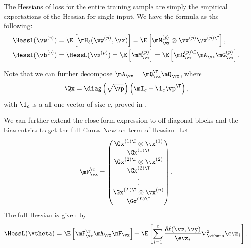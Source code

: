 The Hessians of loss for the entire training sample are simply the empirical expectations of the Hessian for single input. We have the formula as the following:
\begin{align}
    \HessL(\vw^{(p)}) &= \E\left[\mH_\ell(\vw^{(p)}, \vx)\right] = \E\left[\mM^{(p)}_\vx \otimes \vx^{(p)}\vx^{(p)\T}\right],\label{eqn:app_layerwise_approx}\\
    \HessL(\vb^{(p)}) &= \HessL(\vz^{(p)}) = \E\left[\mM^{(p)}_\vx\right] = \E\left[\mG_\vx^{(p)\T}\mA_\vx\mG_\vx^{(p)}\right].
\end{align}

Note that we can further decompose $\mA_\vx = \mQ_\vx^\T\mQ_\vx$, where 
\begin{equation}
    \Qx = \diag\left(\sqrt{\vp}\right)\left(\mI_c-\1_c\vp^\T\right),
    \label{eqn:app_qx}
\end{equation}
with $\1_c$ is a all one vector of size $c$, proved in \citet{papyan2019measurements}.

We can further extend the close form expression to off diagonal blocks and the bias entries to get the full Gauss-Newton term of Hessian. Let
\begin{align}
    \mF^\T_\vx = \begin{pmatrix}
    \Gx^{(1)\T} \otimes \vx^{(1)}\\
    \Gx^{(1)\T}\\
    \Gx^{(2)\T} \otimes \vx^{(2)}\\
    \Gx^{(2)\T}\\
    \vdots\\
    \Gx^{(L)\T} \otimes \vx^{(n)}\\
    \Gx^{(L)\T}
    \end{pmatrix}.
\end{align}
The full Hessian is given by
\begin{equation}
    \HessL(\vtheta) = \E \left[\mF^\T_{\vx}\mA_\vx\mF_{\vx}\right] + \E\left[\sum_{i=1}^c \frac{\partial \ell(\vz,\vy)}{\evz_i} \nabla^2_\vtheta \evz_i \right].
\label{eqn:app_full_hessian}
\end{equation}